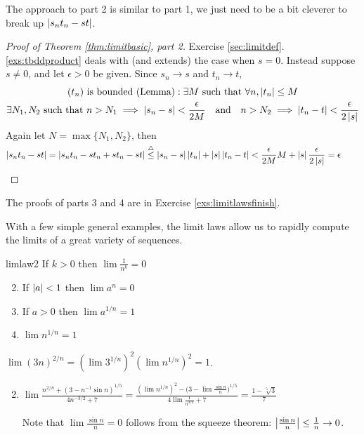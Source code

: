 \goodbreak

The approach to part 2 is similar to part 1, we just need to be a bit cleverer to break up $\left| s_nt_n-st\right|$.

\begin{proof}[Proof of Theorem \ref{thm:limitbasic}, part 2]
	Exercise \ref*{sec:limitdef}.\ref{exs:tbddproduct} deals with (and extends) the case when $s=0$. Instead suppose $s\neq 0$, and let $\epsilon>0$ be given. Since $s_n\to s$ and $t_n\to t$,
 	\begin{gather*}
 	(t_n)\text{ is bounded (Lemma)}:\exists M\text{ such that }\forall n, \left| t_n\right|\le M\\
 	\exists N_1,N_2\text{ such that }n>N_1\implies \left| s_n-s\right|<\frac\epsilon{2M}
 	\quad\text{and}\quad
	n>N_2\implies \left| t_n-t\right|<\frac\epsilon{2\left| s\right|}
 	\end{gather*}
 	Again let $N=\max\{N_1,N_2\}$, then
	\[
		\left| s_nt_n-st\right|=\left| s_nt_n-st_n+st_n-st\right| \overset{\smash{\triangle}}{\le}\left| s_n-s\right|\left| t_n\right|+\left| s\right|\left| t_n-t\right| < \frac\epsilon{2M}M+\left| s\right|\frac\epsilon{2\left| s\right|} =\epsilon\tag*{\qedhere}
	\]
\end{proof}

The proofs of parts 3 and 4 are in Exercise \ref{exs:limitlawsfinish}.





With a few simple general examples, the limit laws allow us to rapidly compute the limits of a great variety of sequences.

\begin{thm}{}{limlaw2}
\exstart If $k>0$ then $\lim\frac 1{n^k}=0$
\begin{enumerate}\setcounter{enumi}{1}\itemsep0pt
	\item If $\left| a\right|<1$ then $\lim a^n=0$
	\item If $a>0$ then $\lim a^{1/n}=1$
	\item $\lim n^{1/n}=1$
\end{enumerate}
\end{thm}


\begin{examples}{}{}
	\exstart $\displaystyle\lim (3n)^{2/n}=(\lim 3^{1/n})^2(\lim n^{1/n})^2=1$.
	\begin{enumerate}\setcounter{enumi}{1}
		\item $\displaystyle\lim\frac{n^{2/n}+\left(3-n^{-1}\sin n\right)^{1/5}}{4n^{-3/2}+7} =\frac{(\lim n^{1/n})^2 -\bigl(3-\lim\frac{\sin n}n\bigr)^{1/5}}{4\lim \frac 1{n^{3/2}}+7} =\frac{1-\sqrt[5]{3}}7$\par
		Note that $\lim\frac{\sin n}n=0$ follows from the squeeze theorem: $\left| \frac{\sin n}n\right|\le \frac 1n\to 0$.
	\end{enumerate}
\end{examples}

